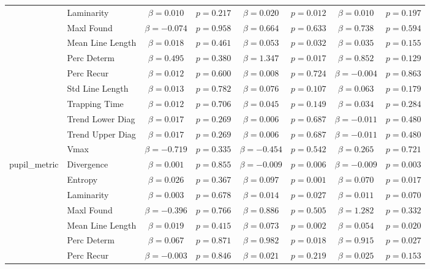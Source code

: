 \begin{tabular}{llcc|cc|cc}
 & Laminarity & $\beta = 0.010$ & $p = 0.217$ & $\beta = 0.020$ & $p = 0.012$ & $\beta = 0.010$ & $p = 0.197$ \\
 & Maxl Found & $\beta = -0.074$ & $p = 0.958$ & $\beta = 0.664$ & $p = 0.633$ & $\beta = 0.738$ & $p = 0.594$ \\
 & Mean Line Length & $\beta = 0.018$ & $p = 0.461$ & $\beta = 0.053$ & $p = 0.032$ & $\beta = 0.035$ & $p = 0.155$ \\
 & Perc Determ & $\beta = 0.495$ & $p = 0.380$ & $\beta = 1.347$ & $p = 0.017$ & $\beta = 0.852$ & $p = 0.129$ \\
 & Perc Recur & $\beta = 0.012$ & $p = 0.600$ & $\beta = 0.008$ & $p = 0.724$ & $\beta = -0.004$ & $p = 0.863$ \\
 & Std Line Length & $\beta = 0.013$ & $p = 0.782$ & $\beta = 0.076$ & $p = 0.107$ & $\beta = 0.063$ & $p = 0.179$ \\
 & Trapping Time & $\beta = 0.012$ & $p = 0.706$ & $\beta = 0.045$ & $p = 0.149$ & $\beta = 0.034$ & $p = 0.284$ \\
 & Trend Lower Diag & $\beta = 0.017$ & $p = 0.269$ & $\beta = 0.006$ & $p = 0.687$ & $\beta = -0.011$ & $p = 0.480$ \\
 & Trend Upper Diag & $\beta = 0.017$ & $p = 0.269$ & $\beta = 0.006$ & $p = 0.687$ & $\beta = -0.011$ & $p = 0.480$ \\
 & Vmax & $\beta = -0.719$ & $p = 0.335$ & $\beta = -0.454$ & $p = 0.542$ & $\beta = 0.265$ & $p = 0.721$ \\
\midrule
\multirow{12}{*}{pupil_metric} & Divergence & $\beta = 0.001$ & $p = 0.855$ & $\beta = -0.009$ & $p = 0.006$ & $\beta = -0.009$ & $p = 0.003$ \\
 & Entropy & $\beta = 0.026$ & $p = 0.367$ & $\beta = 0.097$ & $p = 0.001$ & $\beta = 0.070$ & $p = 0.017$ \\
 & Laminarity & $\beta = 0.003$ & $p = 0.678$ & $\beta = 0.014$ & $p = 0.027$ & $\beta = 0.011$ & $p = 0.070$ \\
 & Maxl Found & $\beta = -0.396$ & $p = 0.766$ & $\beta = 0.886$ & $p = 0.505$ & $\beta = 1.282$ & $p = 0.332$ \\
 & Mean Line Length & $\beta = 0.019$ & $p = 0.415$ & $\beta = 0.073$ & $p = 0.002$ & $\beta = 0.054$ & $p = 0.020$ \\
 & Perc Determ & $\beta = 0.067$ & $p = 0.871$ & $\beta = 0.982$ & $p = 0.018$ & $\beta = 0.915$ & $p = 0.027$ \\
 & Perc Recur & $\beta = -0.003$ & $p = 0.846$ & $\beta = 0.021$ & $p = 0.219$ & $\beta = 0.025$ & $p = 0.153$ \\

\end{tabular}
